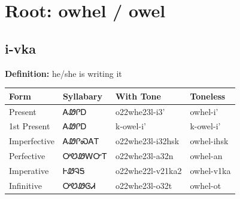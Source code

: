 \documentclass{article}%
\begin{document}
%
\normalsize%
\section*{Root: owhel / owel}%
\subsection*{i-vka}%
\textbf{Definition: }%
he/she is writing it%
\\[0.5em]%
\begin{tabular}{|l|l|l|l|}%
\hline%
\textbf{Form}&\textbf{Syllabary}&\textbf{With Tone}&\textbf{Toneless}\\%
\hline%
Present&ᎪᏪᎵᎠ&o22whe23l{-}i3'&owhel{-}i'\\%
1st Present&ᎪᏪᎵᎠ&k{-}owel{-}i'&k{-}owel{-}i'\\%
Imperfective&ᎪᏪᎵᏍᎪᎢ&o22whe23l{-}i32hsk&owhel{-}ihsk\\%
Perfective&ᎤᏬᏪᎳᏅᎢ&o22whe23l{-}a32n&owhel{-}an\\%
Imperative&ᎰᏪᎸᎦ&o22whe22l{-}v21ka2&owhel{-}v1ka\\%
Infinitive&ᎤᏬᏪᎶᏗ&o22whe23l{-}o32t&owhel{-}ot\\%
\hline%
\end{tabular}%
\\[1em]%
\end{document}
